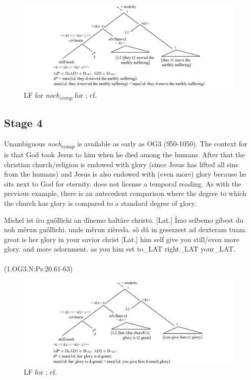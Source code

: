 \documentclass[output=paper,
modfonts
]{langscibook}
\begin{document}
\begin{figure}
\includegraphics[width=1\textwidth]{figures/LF2_comp}
\caption{LF for \textit{noch\textsubscript{comp}} for ; cf. \citep{beck2016a_sub}}
\label{fig:LF2_comp}
\end{figure}

\subsection{Stage 4} Unambiguous \textit{noch}\textsubscript{comp} is available as early as OG3 (950-1050). The context for  is that God took Jesus to him when he died among the humans. After that the christian church/religion is endowed with glory (since Jesus has lifted all sins from the humans) and Jesus is also endowed with (even more) glory because he sits next to God for eternity.  does not license a temporal reading. As with the previous example, there is an antecedent comparison where the degree to which the church has glory is compared to a standard degree of glory.

\ea\gll Michel ist íro guôllichi an dînemo haltâre christo. [Lat.] Ímo selbemo gíbest du noh mêrun guôllichi. unde mêrun ziêreda. sô dû in gesezzest ad dexteram tuam.\\
       great is her glory in your savior christ [Lat.] him self give you still/even more glory. and more adornment. as you him set to\_LAT right\_LAT your\_LAT.\\
\label{OG3_noch_more_glory} \\ (1.OG3.N:Ps:20.61-63)
\z

\begin{figure}
\includegraphics[width=1\textwidth]{figures/LF3_comp}
\caption{LF for ; cf. \citep{beck2016a_sub}}
\label{fig:LF3_comp}
\end{figure}
\end{document}
